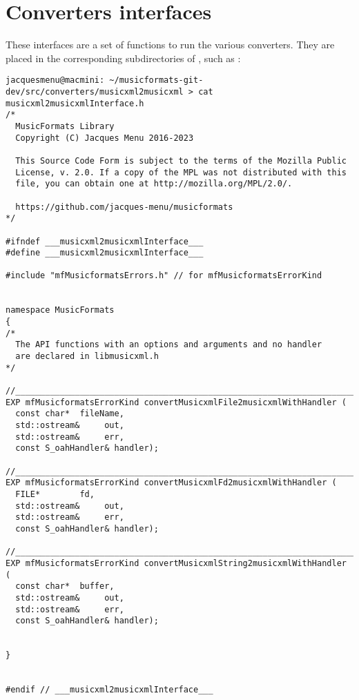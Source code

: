 
\chapter{Converters interfaces}

These interfaces are a set of functions to run the various converters. They are placed in the corresponding subdirectories of \converters, such as :
\begin{lstlisting}[language=Terminal]
jacquesmenu@macmini: ~/musicformats-git-dev/src/converters/musicxml2musicxml > cat musicxml2musicxmlInterface.h
/*
  MusicFormats Library
  Copyright (C) Jacques Menu 2016-2023

  This Source Code Form is subject to the terms of the Mozilla Public
  License, v. 2.0. If a copy of the MPL was not distributed with this
  file, you can obtain one at http://mozilla.org/MPL/2.0/.

  https://github.com/jacques-menu/musicformats
*/

#ifndef ___musicxml2musicxmlInterface___
#define ___musicxml2musicxmlInterface___

#include "mfMusicformatsErrors.h" // for mfMusicformatsErrorKind


namespace MusicFormats
{
/*
  The API functions with an options and arguments and no handler
  are declared in libmusicxml.h
*/

//_______________________________________________________________________________
EXP mfMusicformatsErrorKind convertMusicxmlFile2musicxmlWithHandler (
  const char*  fileName,
  std::ostream&     out,
  std::ostream&     err,
  const S_oahHandler& handler);

//_______________________________________________________________________________
EXP mfMusicformatsErrorKind convertMusicxmlFd2musicxmlWithHandler (
  FILE*        fd,
  std::ostream&     out,
  std::ostream&     err,
  const S_oahHandler& handler);

//_______________________________________________________________________________
EXP mfMusicformatsErrorKind convertMusicxmlString2musicxmlWithHandler (
  const char*  buffer,
  std::ostream&     out,
  std::ostream&     err,
  const S_oahHandler& handler);


}


#endif // ___musicxml2musicxmlInterface___
\end{lstlisting}


